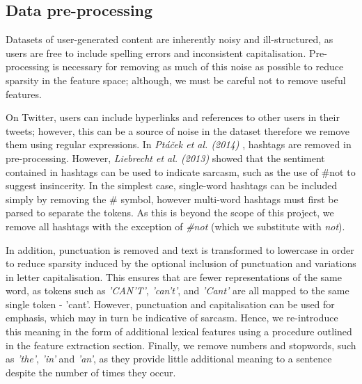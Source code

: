 \documentclass[12pt,a4paper]{article}
\begin{document}
\subsection{Data pre-processing}
\vspace{-4.2pt}
\noindent Datasets of user-generated content are inherently noisy and ill-structured, as users are free to include spelling errors and inconsistent capitalisation. Pre-processing is necessary for removing as much of this noise as possible to reduce sparsity in the feature space; although, we must be careful not to remove useful features.\\ \vspace{-10pt}

\noindent On Twitter, users can include hyperlinks and references to other users in their tweets; however, this can be a source of noise in the dataset therefore we remove them using regular expressions. In \textit{Pt{\'a}{\v{c}ek et al. (2014)}} \cite{ptavcek2014sarcasm}, hashtags are removed in pre-processing. However, \textit{Liebrecht et al. (2013)} \cite{liebrecht2013perfect} showed that the sentiment contained in hashtags can be used to indicate sarcasm, such as the use of \#not to suggest insincerity. In the simplest case, single-word hashtags can be included simply by removing the \# symbol, however multi-word hashtags must first be parsed to separate the tokens. As this is beyond the scope of this project, we remove all hashtags with the exception of \textit{\#not} (which we substitute with \textit{not}).\\\vspace{-10pt}

\noindent In addition, punctuation is removed and text is transformed to lowercase in order to reduce sparsity induced by the optional inclusion of punctuation and variations in letter capitalisation. This ensures that are fewer representations of the same word, as tokens such as \textit{'CAN'T'}, \textit{'can't'}, and \textit{'Cant'} are all mapped to the same single token - 'cant'. However, punctuation and capitalisation can be used for emphasis, which may in turn be indicative of sarcasm. Hence, we re-introduce this meaning in the form of additional lexical features using a procedure outlined in the feature extraction section. Finally, we remove numbers and stopwords, such as \textit{'the'}, \textit{'in'} and \textit{'an'}, as they provide little additional meaning to a sentence despite the number of times they occur.\vspace{-5pt}
\end{document}
